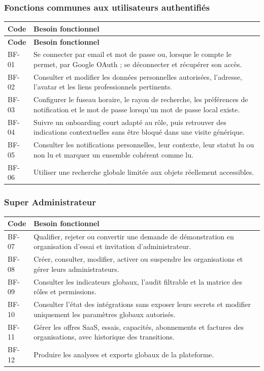 \subsubsection{Fonctions communes aux utilisateurs authentifiés}

\begin{longtable}{|C{1.35cm}|p{12.3cm}|}
  \hline
  \textbf{Code} & \textbf{Besoin fonctionnel}\\
  \hline
  \endfirsthead
  \hline
  \textbf{Code} & \textbf{Besoin fonctionnel}\\
  \hline
  \endhead
  BF-01 & Se connecter par email et mot de passe ou, lorsque le compte le permet,
  par Google OAuth ; se déconnecter et récupérer son accès.\\\hline
  BF-02 & Consulter et modifier les données personnelles autorisées, l'adresse,
  l'avatar et les liens professionnels pertinents.\\\hline
  BF-03 & Configurer le fuseau horaire, le rayon de recherche, les préférences de
  notification et le mot de passe lorsqu'un mot de passe local existe.\\\hline
  BF-04 & Suivre un onboarding court adapté au rôle, puis retrouver des indications
  contextuelles sans être bloqué dans une visite générique.\\\hline
  BF-05 & Consulter les notifications personnelles, leur contexte, leur statut lu ou
  non lu et marquer un ensemble cohérent comme lu.\\\hline
  BF-06 & Utiliser une recherche globale limitée aux objets réellement accessibles.\\
  \hline
\end{longtable}

\subsubsection{Super Administrateur}

\begin{longtable}{|C{1.35cm}|p{12.3cm}|}
  \hline
  \textbf{Code} & \textbf{Besoin fonctionnel}\\
  \hline
  BF-07 & Qualifier, rejeter ou convertir une demande de démonstration en organisation
  d'essai et invitation d'administrateur.\\\hline
  BF-08 & Créer, consulter, modifier, activer ou suspendre les organisations et gérer
  leurs administrateurs.\\\hline
  BF-09 & Consulter les indicateurs globaux, l'audit filtrable et la matrice des rôles
  et permissions.\\\hline
  BF-10 & Consulter l'état des intégrations sans exposer leurs secrets et modifier
  uniquement les paramètres globaux autorisés.\\\hline
  BF-11 & Gérer les offres SaaS, essais, capacités, abonnements et factures des
  organisations, avec historique des transitions.\\\hline
  BF-12 & Produire les analyses et exports globaux de la plateforme.\\
  \hline
\end{longtable}

